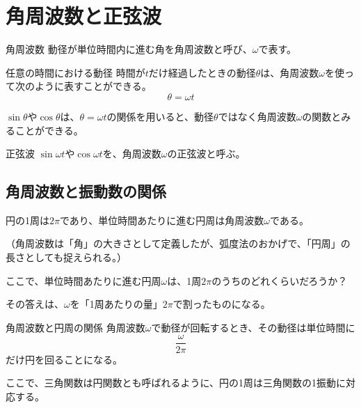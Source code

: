 \documentclass[16pt,b5paper]{book}
\begin{document}
\section{角周波数と正弦波}

\begin{definition}{角周波数}
  動径が単位時間内に進む角を角周波数と呼び、$\omega$で表す。
\end{definition}

\begin{theorem}{任意の時間における動径}
  \newline
  時間が$t$だけ経過したときの動径$\theta$は、角周波数$\omega$を使って次のように表すことができる。
  \LARGE
  \begin{equation}
    \theta = \omega t
  \end{equation}
\end{theorem}

$\sin\theta$や$\cos\theta$は、$\theta=\omega t$の関係を用いると、動径$\theta$ではなく角周波数$\omega$の関数とみることができる。

\begin{definition}{正弦波}
  $\sin\omega t$や$\cos\omega t$を、角周波数$\omega$の正弦波と呼ぶ。
\end{definition}

\subsection{角周波数と振動数の関係}

円の1周は$2\pi$であり、単位時間あたりに進む円周は角周波数$\omega$である。

\footnotesize
（角周波数は「角」の大きさとして定義したが、弧度法のおかげで、「円周」の長さとしても捉えられる。）
\normalsize

ここで、単位時間あたりに進む円周$\omega$は、1周$2\pi$のうちのどれくらいだろうか？

その答えは、$\omega$を「1周あたりの量」$2\pi$で割ったものになる。

\begin{theorem}{角周波数と円周の関係}
  \newline
  角周波数$\omega$で動径が回転するとき、その動径は単位時間に
  \LARGE
  \begin{equation}
    \dfrac{\omega}{2\pi}
  \end{equation}
  \normalsize
  だけ円を回ることになる。
\end{theorem}

ここで、三角関数は円関数とも呼ばれるように、円の1周は三角関数の1振動に対応する。
\end{document}
